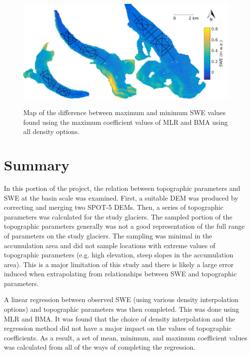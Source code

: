 \documentclass[12pt]{article}
\begin{document}
\begin{figure}[H]
	\centering
	\includegraphics[width =\textwidth]{SWErangeModelled.png}\\
	\caption{Map of the difference between maximum and minimum SWE values found using the maximum coefficient values of MLR and BMA using all density options.}
	\label{fig:SWErangeModelled}
\end{figure}
	

\section{Summary}

In this portion of the project, the relation between topographic parameters and SWE at the basin scale was examined. First, a suitable DEM was produced by correcting and merging two SPOT-5 DEMs. Then, a series of topographic parameters was calculated for the study glaciers. The sampled portion of the topographic parameters generally was not a good representation of the full range of parameters on the study glaciers. The sampling was minimal in the accumulation area and did not sample locations with extreme values of topographic parameters (e.g. high elevation, steep slopes in the accumulation area). This is a major limitation of this study and there is likely a large error induced when extrapolating from relationships between SWE and topographic parameters. 

A linear regression between observed SWE (using various density interpolation options) and topographic parameters was then completed. This was done using MLR and BMA. It was found that the choice of density interpolation and the regression method did not have a major impact on the values of  topographic coefficients. As a result, a set of mean, minimum, and maximum coefficient values was calculated from all of the ways of completing the regression. 
\end{document}
